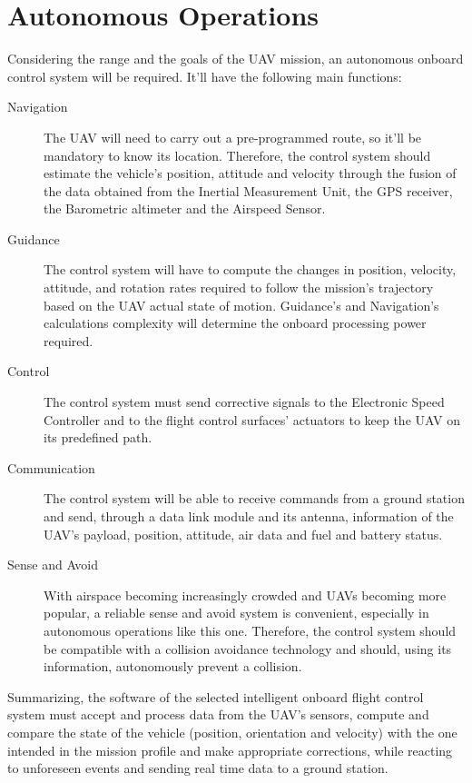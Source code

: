 \documentclass[english,fira]{ist-report}
\begin{document}
\section{Autonomous Operations}

Considering the range and the goals of the UAV mission, an autonomous onboard control system will be required. It'll have the following main functions:
\begin{description}
	\item[Navigation] The UAV will need to carry out a pre-programmed route, so it'll be mandatory to know its location. Therefore, the control system should estimate the vehicle's position, attitude and velocity through the fusion of the data obtained from the Inertial Measurement Unit, the GPS receiver, the Barometric altimeter and the Airspeed Sensor.
	\item[Guidance] The control system will have to compute the changes in position, velocity, attitude, and rotation rates required to follow the mission's trajectory based on the UAV actual state of motion. Guidance's and Navigation's calculations complexity will determine the onboard processing power required.
	\item[Control] The control system must send corrective signals to the Electronic Speed Controller and to the flight control surfaces' actuators to keep the UAV on its predefined path.
	\item[Communication] The control system will be able to receive commands from a ground station and send, through a data link module and its antenna, information of the UAV's payload, position, attitude, air data and fuel and battery status.
	\item[Sense and Avoid] With airspace becoming increasingly crowded and UAVs becoming more popular, a reliable sense and avoid system is convenient, especially in autonomous operations like this one. Therefore, the control system should be compatible with a collision avoidance technology and should, using its information, autonomously prevent a collision.
\end{description}

Summarizing, the software of the selected intelligent onboard flight control system must accept and process data from the UAV's sensors, compute and compare the state of the vehicle (position, orientation and velocity) with the one intended in the mission profile and make appropriate corrections, while reacting to unforeseen events and sending real time data to a ground station.
\end{document}
